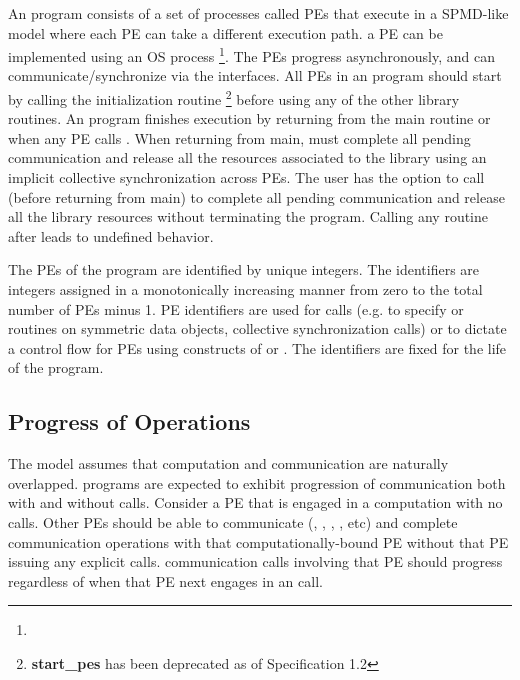 An \openshmem program consists of a set of \openshmem processes called \ac{PE}s
that execute in a \ac{SPMD}-like model where each \ac{PE} can take a different
execution path.  a \ac{PE} can be implemented using an OS
process  \footnote{}.  The \ac{PE}s progress asynchronously, and can communicate/synchronize
via the \openshmem interfaces.  All \ac{PE}s in an \openshmem program should
start by calling the initialization routine  
\footnote{\textbf{start\_pes} has been deprecated as of Specification 1.2}
before using any of the other \openshmem library routines.  An \openshmem
program finishes execution by returning from the main routine or when any PE
calls . When returning from main, \openshmem must
complete all pending communication and release all the resources associated to
the library using an implicit collective synchronization across PEs. The user
has the option to call  (before returning from main) to
complete all pending communication and release all the \openshmem library
resources without terminating the program. Calling any \openshmem routine after
 leads to undefined behavior.

The \ac{PE}s of the \openshmem program are identified by unique integers.  The
identifiers are integers assigned in a monotonically increasing manner from zero
to the total number of \ac{PE}s minus 1. \ac{PE} identifiers are used for
\openshmem calls (e.g. to specify  or  routines on symmetric
data objects, collective synchronization calls) or to dictate a control flow for
\ac{PE}s using constructs of \Clang{} or \Fortran. The identifiers are fixed for
the life of the \openshmem program.

\subsection{Progress of \openshmem Operations}\label{subsec:progress}

The \openshmem model assumes that computation and communication are naturally
overlapped. \openshmem programs are expected to exhibit progression of
communication both with and without \openshmem calls. Consider a \ac{PE} that is
engaged in a computation with no \openshmem calls. Other \ac{PE}s should be able
to communicate (, , , , etc) and
complete communication operations with that computationally-bound \ac{PE}
without that \ac{PE} issuing any explicit \openshmem calls. \openshmem
communication calls involving that \ac{PE} should progress regardless of when
that \ac{PE} next engages in an \openshmem call.

